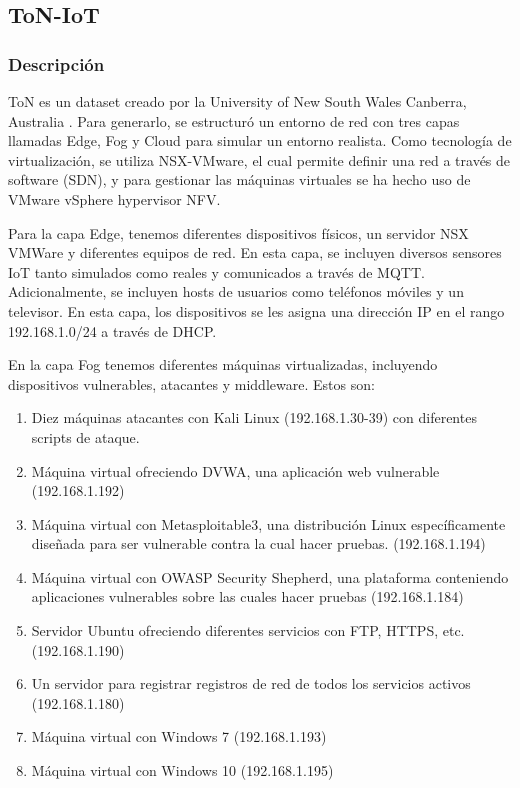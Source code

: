 \subsection{ToN-IoT}

\subsubsection{Descripción}

ToN es un dataset creado por la University of New South Wales Canberra, Australia \cite{9189760}. Para generarlo, se estructuró un entorno de red con tres capas llamadas Edge, Fog y Cloud para simular un entorno realista. Como tecnología de virtualización, se utiliza NSX-VMware, el cual permite definir una red a través de software (SDN), y para gestionar las máquinas virtuales se ha hecho uso de VMware vSphere hypervisor NFV.

Para la capa Edge, tenemos diferentes dispositivos físicos, un servidor NSX VMWare y diferentes equipos de red. En esta capa, se incluyen diversos sensores IoT tanto simulados como reales y comunicados a través de MQTT. Adicionalmente, se incluyen hosts de usuarios como teléfonos móviles y un televisor. En esta capa, los dispositivos se les asigna una dirección IP en el rango 192.168.1.0/24 a través de DHCP.

En la capa Fog tenemos diferentes máquinas virtualizadas, incluyendo dispositivos vulnerables, atacantes y middleware. Estos son:
\begin{enumerate}
  \item Diez máquinas atacantes con Kali Linux (192.168.1.30-39) con diferentes scripts de ataque.
  \item Máquina virtual ofreciendo DVWA, una aplicación web vulnerable (192.168.1.192)
  \item Máquina virtual con Metasploitable3, una distribución Linux específicamente diseñada para ser vulnerable contra la cual hacer pruebas. (192.168.1.194)
  \item Máquina virtual con OWASP Security Shepherd, una plataforma conteniendo aplicaciones vulnerables sobre las cuales hacer pruebas (192.168.1.184)
  \item Servidor Ubuntu ofreciendo diferentes servicios con FTP, HTTPS, etc. (192.168.1.190)
  \item Un servidor para registrar registros de red de todos los servicios activos (192.168.1.180)
  \item Máquina virtual con Windows 7 (192.168.1.193)
  \item Máquina virtual con Windows 10 (192.168.1.195)
\end{enumerate}

